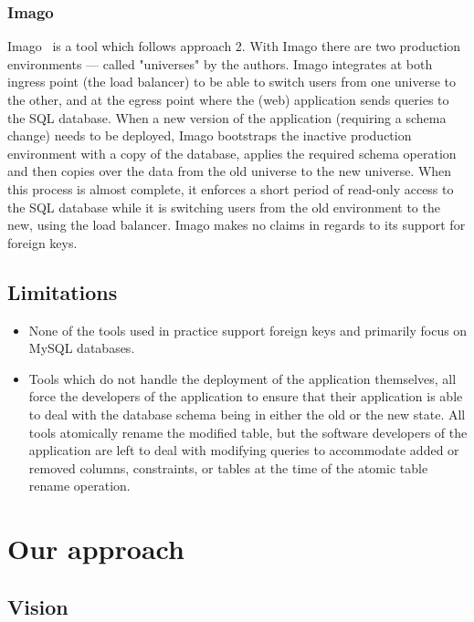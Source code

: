 \documentclass[conference]{IEEEtran}
\begin{document}
\subsubsection{Imago}
Imago~\cite{Dumitras:2009:WUF:1656980.1657005} is a tool which follows approach 2. With Imago there are two production environments --- called "universes" by the authors. Imago integrates at both ingress point (the load balancer) to be able to switch users from one universe to the other, and at the egress point where the (web) application sends queries to the SQL database. When a new version of the application (requiring a schema change) needs to be deployed, Imago bootstraps the inactive production environment with a copy of the database, applies the required schema operation and then copies over the data from the old universe to the new universe. When this process is almost complete, it enforces a short period of read-only access to the SQL database while it is switching users from the old environment to the new, using the load balancer. Imago makes no claims in regards to its support for foreign keys.

\subsection{Limitations} 

\begin{itemize}
  \item{None of the tools used in practice support foreign keys and primarily focus on MySQL databases.}
  \item{Tools which do not handle the deployment of the application themselves, all force the developers of the application to ensure that their application is able to deal with the database schema being in either the old or the new state. All tools atomically rename the modified table, but the software developers of the application are left to deal with modifying queries to accommodate added or removed columns, constraints, or tables at the time of the atomic table rename operation.}
\end{itemize}

\section{Our approach} %

\subsection{Vision}
\end{document}
